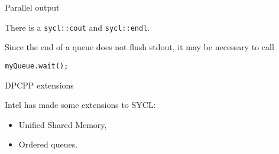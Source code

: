  {Parallel output}

There is a \lstinline+sycl::cout+ and \lstinline+sycl::endl+.


Since the end of a queue does not flush stdout,
it may be necessary to call
\begin{lstlisting}
myQueue.wait();  
\end{lstlisting}

 {DPCPP extensions}

Intel has made some extensions to SYCL:
\begin{itemize}
\item Unified Shared Memory,
\item Ordered queues.
\end{itemize}
